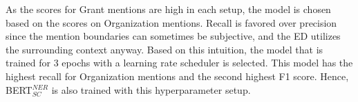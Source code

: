 \documentclass{report}
\theoremstyle{definition}
\theoremstyle{remark}
\begin{document}
As the scores for Grant mentions are high in each setup, the model is chosen based on the scores on Organization mentions. Recall is favored over precision since the mention boundaries can sometimes be subjective, and the ED utilizes the surrounding context anyway. Based on this intuition, the model that is trained for 3 epochs with a learning rate scheduler is selected. This model has the highest recall for Organization mentions and the second highest F1 score. Hence, BERT$^{NER}_{SC}$ is also trained with this hyperparameter setup.
\end{document}
